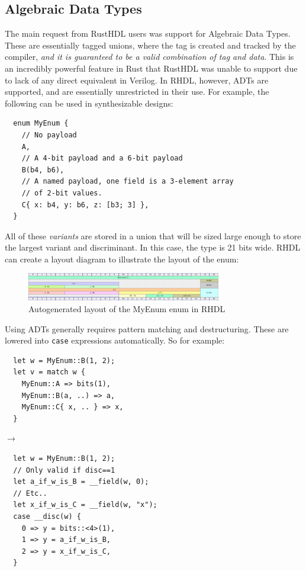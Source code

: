 \documentclass[sigplan,screen,sigconf]{acmart}
\begin{document}
\subsection{Algebraic Data Types}
The main request from RustHDL users was support for Algebraic Data Types. These are essentially tagged unions, where the tag is created and tracked by the compiler, \emph{and it is guaranteed to be a valid combination of tag and data}.  This is an incredibly powerful feature in Rust that RustHDL was unable to support due to lack of any direct equivalent in Verilog.  In RHDL, however, ADTs are supported, and are essentially unrestricted in their use.  For example, the following can be used in synthesizable designs:
\begin{verbatim}
  enum MyEnum {
    // No payload
    A, 
    // A 4-bit payload and a 6-bit payload
    B(b4, b6),
    // A named payload, one field is a 3-element array
    // of 2-bit values.
    C{ x: b4, y: b6, z: [b3; 3] }, 
  }
\end{verbatim}
All of these \emph{variants} are stored in a union that will be sized large enough to store the largest variant and discriminant.  In this case, the type is 21 bits wide.  RHDL can create a layout diagram to illustrate the layout of the enum:
\begin{figure}[h]
  \centering
  \includegraphics[width=8.5cm]{my_enum.png}
  \caption{Autogenerated layout of the MyEnum enum in RHDL}
\end{figure}
Using ADTs generally requires pattern matching and destructuring.  These are lowered into \verb|case| expressions automatically.  So for example:
\begin{center}
\begin{minipage}{3.8cm}
\begin{verbatim}
  let w = MyEnum::B(1, 2);
  let v = match w {
    MyEnum::A => bits(1),
    MyEnum::B(a, ..) => a,
    MyEnum::C{ x, .. } => x,
  }
\end{verbatim}
\end{minipage}
$\rightarrow$
\begin{minipage}{4.1cm}
\begin{verbatim}
  let w = MyEnum::B(1, 2);
  // Only valid if disc==1
  let a_if_w_is_B = __field(w, 0); 
  // Etc..
  let x_if_w_is_C = __field(w, "x");
  case __disc(w) {
    0 => y = bits::<4>(1),
    1 => y = a_if_w_is_B,
    2 => y = x_if_w_is_C,
  }
\end{verbatim}
\end{minipage}
\end{center}
\end{document}

